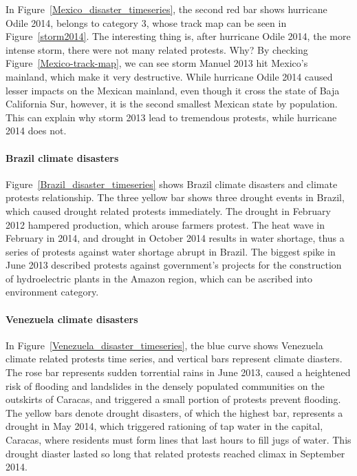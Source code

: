 \documentclass[9pt,twocolumn,twoside]{pnas-new}
\begin{document}
In Figure~\ref{Mexico_disaster_timeseries}, the second red bar shows hurricane Odile 2014, belongs to category 3, whose track map can be seen in Figure~\ref{storm2014}. The interesting thing is, after hurricane Odile 2014, the more intense storm, there were not many related protests. Why? By checking Figure~\ref{Mexico-track-map}, we can see storm Manuel 2013 hit Mexico's mainland, which make it very destructive. While hurricane Odile 2014 caused lesser impacts on the Mexican mainland, even though it cross the state of Baja California Sur, however, it is the second smallest Mexican state by population. This can explain why storm 2013 lead to tremendous protests, while hurricane 2014 does not.

\paragraph{Brazil climate disasters}
Figure~\ref{Brazil_disaster_timeseries} shows Brazil climate disasters and climate protests relationship. The three yellow bar shows three drought events in Brazil, which caused drought related protests immediately. The drought in February 2012 hampered production, which arouse farmers protest. The heat wave in February in 2014, and drought in October 2014 results in water shortage, thus a series of protests against water shortage abrupt in Brazil. The biggest spike in June 2013 described protests against government's projects for the construction of hydroelectric plants in the Amazon region, which can be ascribed into environment category.


\paragraph{Venezuela climate disasters}
In Figure~\ref{Venezuela_disaster_timeseries}, the blue curve shows Venezuela climate related protests time series, and  vertical bars represent climate diasters. The rose bar represents sudden torrential rains in June 2013, caused a heightened risk of flooding and landslides in the densely populated communities on the outskirts of Caracas, and triggered a small portion of protests prevent flooding. The yellow bars denote drought disasters, of which the highest bar, represents a drought in May 2014, which triggered rationing of tap water in the capital, Caracas, where residents must form lines that last hours to fill jugs of water. This drought diaster lasted so long that related protests reached climax in September 2014.
\end{document}
